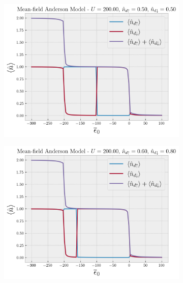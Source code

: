 \documentclass[a4paper,fleqn,12pt]{article}
\begin{document}
\begin{figure}[H]
\centering
\begin{subfigure}{.5\textwidth}
  \centering
  \includegraphics[width=\linewidth]{fig/plot-U_200-up_0.5-down_0.50.png}
\end{subfigure}%
\begin{subfigure}{.5\textwidth}
  \centering
  \includegraphics[width=\linewidth]{fig/plot-U_200-up_0.6-down_0.80.png}
\end{subfigure}
\end{figure}

\n\n\n\n
\end{document}
